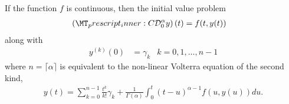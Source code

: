 \documentclass{article}
\begin{document}
\begin{lemma}
\label{lem:fde_volt_equiv}
If the function $ f $ is continuous, then the initial value problem
\begin{align}
	\label{eq:fde-2}
	\capder{0}{\alpha}{y}(t) &= f(t,y(t))
\end{align}
along with 
\begin{align}
	\label{eq:fde-2-ic}
	y^{(k)}(0) &= \gamma_k & k=0,1,\ldots, n-1 
\end{align}
where $ n = \lceil \alpha \rceil $
is equivalent to the non-linear Volterra equation of the second kind,
\begin{align*}
	y(t) = \sum_{k=0}^{n-1} \frac{t^k}{k!} \gamma_k + \frac{1}{\Gamma(\alpha)} \int_0^t (t-u)^{\alpha-1} f(u,y(u))du.
\end{align*}
\end{lemma}
\end{document}
